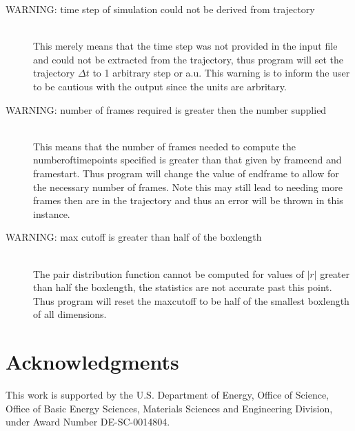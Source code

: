 \documentclass{article}
\begin{document}
\begin{description}
	\item[WARNING: time step of simulation could not be derived from trajectory] \hfill \\
	This merely means that the time step was not provided in the input file and could not be extracted from the trajectory, thus program will set the trajectory $\Delta t$ to 1 arbitrary step or a.u.  This warning is to inform the user to be cautious with the output since the units are arbritary.
	
	\item[WARNING: number of frames required is greater then the number supplied] \hfill \\
	This means that the number of frames needed to compute the numberoftimepoints specified is greater than that given by frameend and framestart. Thus program will change the value of endframe to allow for the necessary number of frames.  Note this may still lead to needing more frames then are in the trajectory and thus an error will be thrown in this instance.
	
	\item[WARNING: max cutoff is greater than half of the boxlength] \hfill \\
	The pair distribution function cannot be computed for values of $|r|$ greater than half the boxlength, the statistics are not accurate past this point.  Thus program will reset the maxcutoff to be half of the smallest boxlength of all dimensions.
	
	
\end{description}

\section*{Acknowledgments}
This work is supported by the U.S. Department of Energy, Office of Science, Office of Basic Energy Sciences, Materials Sciences and Engineering Division, under Award Number DE-SC-0014804.



\end{document}
